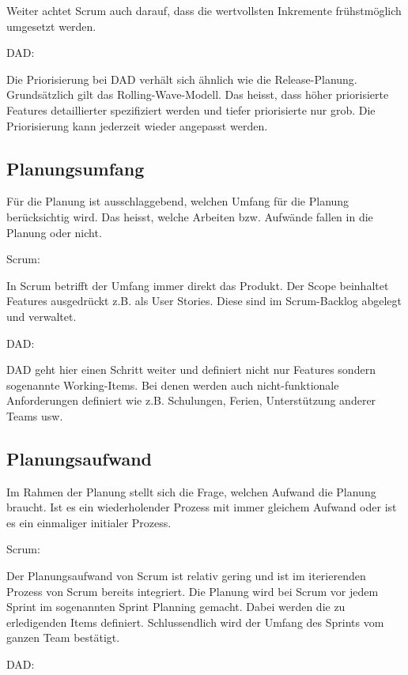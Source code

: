 Weiter achtet Scrum auch darauf, dass die wertvollsten Inkremente frühstmöglich umgesetzt werden.\bigskip 

{\Large DAD:} \cite{planningPrioDad} \medskip

Die Priorisierung bei DAD verhält sich ähnlich wie die Release-Planung. Grundsätzlich gilt das Rolling-Wave-Modell. Das heisst, dass höher priorisierte Features detaillierter spezifiziert werden und tiefer priorisierte nur grob. Die Priorisierung kann jederzeit wieder angepasst werden.


\subsection{Planungsumfang}

Für die Planung ist ausschlaggebend, welchen Umfang für die Planung berücksichtig wird. Das heisst, welche Arbeiten bzw. Aufwände fallen in die Planung oder nicht.

{\Large Scrum:} \medskip

In Scrum betrifft der Umfang immer direkt das Produkt. Der Scope beinhaltet Features ausgedrückt z.B. als User Stories. Diese sind im Scrum-Backlog abgelegt und verwaltet.
\bigskip 

{\Large DAD:} \cite{planningScopeDad} \medskip

DAD geht hier einen Schritt weiter und definiert nicht nur Features sondern sogenannte Working-Items. Bei denen werden auch nicht-funktionale Anforderungen definiert wie z.B. Schulungen, Ferien, Unterstützung anderer Teams usw.	


\subsection{Planungsaufwand}

Im Rahmen der Planung stellt sich die Frage, welchen Aufwand die Planung braucht. Ist es ein wiederholender Prozess mit immer gleichem Aufwand oder ist es ein einmaliger initialer Prozess.

{\Large Scrum:} \medskip

Der Planungsaufwand von Scrum ist relativ gering und ist im iterierenden Prozess von Scrum bereits integriert. Die Planung wird bei Scrum vor jedem Sprint im sogenannten Sprint Planning gemacht. Dabei werden die zu erledigenden Items definiert. Schlussendlich wird der Umfang des Sprints vom ganzen Team bestätigt.\bigskip 

{\Large DAD:} \medskip

